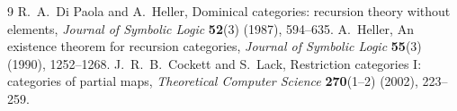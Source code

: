 \documentclass[11pt]{article}
\theoremstyle{definition}
\begin{document}
\begin{thebibliography}{9}
 R.~A.~Di Paola and A.~Heller,
Dominical categories: recursion theory without elements,
\emph{Journal of Symbolic Logic} \textbf{52}(3) (1987), 594--635.
 A.~Heller,
An existence theorem for recursion categories,
\emph{Journal of Symbolic Logic} \textbf{55}(3) (1990), 1252--1268.
 J.~R.~B.~Cockett and S.~Lack,
Restriction categories I: categories of partial maps,
\emph{Theoretical Computer Science} \textbf{270}(1--2) (2002), 223--259.
\end{thebibliography}
\end{document}
